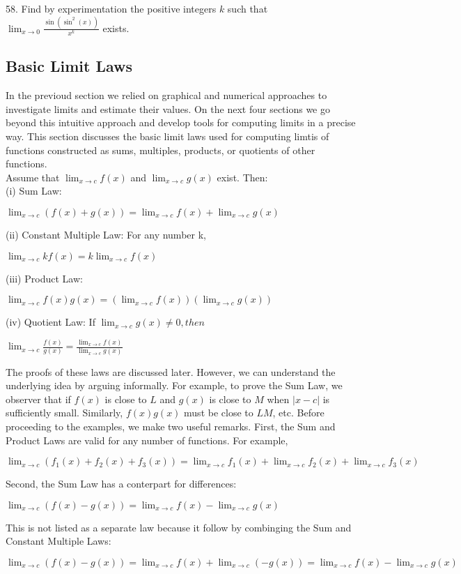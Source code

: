 \documentclass{article}
\begin{document}
58. Find by experimentation the positive integers $k$ such that $\lim_{x \to 0}\frac{\sin(\sin^2(x))}{x^k}$ exists.\\

\subsection*{Basic Limit Laws}

In the previoud section we relied on graphical and numerical approaches to investigate limits and estimate their values. On the next four sections we go beyond this intuitive approach and develop tools for computing limits in a precise way. This section discusses the basic limit laws used for computing limtis of functions constructed as sums, multiples, products, or quotients of other functions.\\

Assume that $\lim_{x \to c}f(x)$ and $\lim_{x \to c}g(x)$ exist. Then:\\

(i) Sum Law:
\begin{center}$\lim_{x \to c}(f(x) + g(x)) = \lim_{x \to c}f(x) + \lim_{x \to c}g(x)$\end{center}

(ii) Constant Multiple Law: For any number k,
\begin{center}$\lim_{x \to c}kf(x) = k\lim_{x \to c}f(x)$\end{center}

(iii) Product Law:
\begin{center}$\lim_{x \to c}f(x)g(x) = (\lim_{x \to c}f(x))(\lim_{x \to c}g(x))$\end{center}

(iv) Quotient Law: If $\lim_{x \to c}g(x) \neq 0, then$
\begin{center}$\lim_{x \to c}\frac{f(x)}{g(x)} = \frac{\lim_{x \to c}f(x)}{\lim_{x \to c}g(x)}$\end{center}

	The proofs of these laws are discussed later. However, we can understand the underlying idea by arguing informally. For example, to prove the Sum Law, we observer that if $f(x)$ is close to $L$ and $g(x)$ is close to $M$ when $\left|x - c\right|$ is sufficiently small. Similarly, $f(x)g(x)$ must be close to $LM$, etc.
	Before proceeding to the examples, we make two useful remarks. First, the Sum and Product Laws are valid for any number of functions. For example,
\begin{center}$\lim_{x \to c}(f_1(x) + f_2(x) + f_3(x)) = \lim_{x \to c}f_1(x) + \lim_{x \to c}f_2(x) + \lim_{x \to c}f_3(x)$\end{center}
	Second, the Sum Law has a conterpart for differences:
\begin{center}$\lim_{x \to c}(f(x) - g(x)) = \lim_{x \to c}f(x) - \lim_{x \to c}g(x) $\end{center}
	This is not listed as a separate law because it follow by combinging the Sum and Constant Multiple Laws:
\begin{center} $\lim_{x \to c}(f(x) - g(x)) = \lim_{x \to c}f(x) + \lim_{x \to c}(- g(x)) = \lim_{x \to c}f(x) - \lim_{x \to c}g(x)$\end{center}
\end{document}
